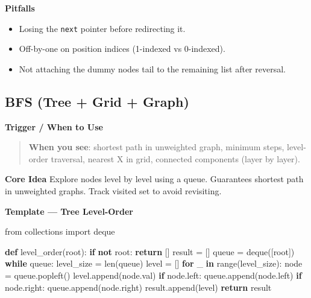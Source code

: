 \documentclass[11pt]{article}
\providecommand{\tightlist}{\setlength{\itemsep}{1pt}\setlength{\parskip}{0pt}}
\newenvironment{Shaded}{\begin{snugshade}}{\end{snugshade}}
\newcommand{\BuiltInTok}[1]{\textcolor[rgb]{0.50,0.55,0.55}{#1}}
\newcommand{\ControlFlowTok}[1]{\textcolor[rgb]{0.99,0.74,0.29}{\textbf{#1}}}
\newcommand{\ImportTok}[1]{\textcolor[rgb]{0.15,0.68,0.38}{#1}}
\newcommand{\KeywordTok}[1]{\textcolor[rgb]{0.81,0.81,0.76}{\textbf{#1}}}
\newcommand{\NormalTok}[1]{\textcolor[rgb]{0.81,0.81,0.76}{#1}}
\newcommand{\OperatorTok}[1]{\textcolor[rgb]{0.81,0.81,0.76}{#1}}
\begin{document}
\textbf{Pitfalls}

\begin{itemize}
\tightlist
\item
  Losing the \texttt{next} pointer before redirecting it.
\item
  Off-by-one on position indices (1-indexed vs 0-indexed).
\item
  Not attaching the dummy node\textquotesingle s tail to the remaining list after reversal.
\end{itemize}

\subsection{BFS (Tree + Grid + Graph)}\label{bfs-tree--grid--graph}

\textbf{Trigger / When to Use}

\begin{quote}
\textbf{When you see}: shortest path in unweighted graph, minimum steps, level-order traversal, nearest X in grid, connected components (layer by layer).
\end{quote}

\textbf{Core Idea}
Explore nodes level by level using a queue. Guarantees shortest path in unweighted graphs. Track visited set to avoid revisiting.

\textbf{Template --- Tree Level-Order}


\begin{Shaded}
\begin{Highlighting}[]
\ImportTok{from}\NormalTok{ collections }\ImportTok{import}\NormalTok{ deque}

\KeywordTok{def}\NormalTok{ level\_order(root):}
    \ControlFlowTok{if} \KeywordTok{not}\NormalTok{ root:}
        \ControlFlowTok{return}\NormalTok{ []}
\NormalTok{    result }\OperatorTok{=}\NormalTok{ []}
\NormalTok{    queue }\OperatorTok{=}\NormalTok{ deque([root])}
    \ControlFlowTok{while}\NormalTok{ queue:}
\NormalTok{        level\_size }\OperatorTok{=} \BuiltInTok{len}\NormalTok{(queue)}
\NormalTok{        level }\OperatorTok{=}\NormalTok{ []}
        \ControlFlowTok{for}\NormalTok{ \_ }\KeywordTok{in} \BuiltInTok{range}\NormalTok{(level\_size):}
\NormalTok{            node }\OperatorTok{=}\NormalTok{ queue.popleft()}
\NormalTok{            level.append(node.val)}
            \ControlFlowTok{if}\NormalTok{ node.left:  queue.append(node.left)}
            \ControlFlowTok{if}\NormalTok{ node.right: queue.append(node.right)}
\NormalTok{        result.append(level)}
    \ControlFlowTok{return}\NormalTok{ result}
\end{Highlighting}
\end{Shaded}
\end{document}

